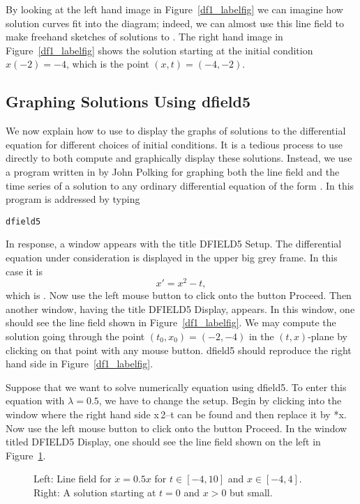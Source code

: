 By looking at the left hand image in Figure~\ref{df1_labelfig}
we can imagine how solution curves fit into the diagram; indeed,
we can almost use this line field to make freehand sketches
of solutions to .  The right hand image in
Figure~\ref{df1_labelfig} shows the solution starting at the
initial condition $x(-2) = -4$, which is the point $(x,t)=(-4,-2)$.


\subsection*{Graphing Solutions Using {\sf dfield5}}

We now explain how to use \Matlab to display the graphs of
solutions to the differential equation  for different
choices of initial conditions.  It is a tedious process to use
\Matlab directly to both compute and graphically display these
solutions.  Instead, we use a program written in \Matlab by John
Polking for graphing both the line field and the time 
series of a solution to any ordinary differential equation of the form
.  In \Matlab this program is addressed by typing
\begin{verbatim}
dfield5
\end{verbatim}
In response, a window appears with the title {\sf
DFIELD5 Setup.}  The differential equation under consideration is 
displayed in the upper big grey frame.  In this case it is
\[
	x' = x^2 - t,
\]
which is .  Now use the left 
mouse button to click onto the button {\sf Proceed}.  
Then another window, having the title {\sf DFIELD5 Display},
appears.  In this window, one should see the line
field shown in Figure~\ref{df1_labelfig}.  We may compute the
solution going through the point $(t_0,x_0)=(-2,-4)$ in the
$(t,x)$-plane by clicking on that point with any mouse button.
{\sf dfield5} should reproduce the right hand side in
Figure~\ref{df1_labelfig}.

Suppose that we want to solve numerically equation 
using {\sf dfield5}. To enter this equation with $\lambda = 0.5$,
we have to change the setup.  Begin by clicking into the window
where the right hand side {\sf x\^{$\,\!$}2--t} can be found and
then replace it by {*x}.  Now use the left mouse button
to click onto the button {\sf Proceed}.  In the window titled
{\sf DFIELD5 Display}, one should see the line field
 shown on
the left in Figure~\ref{df_dsp1}.
\begin{figure}[htb]
    \centerline{%
    }
    \caption{Left: Line field for $\dot{x}=0.5x$ for $t\in [-4,10]$ and
		$x\in [-4,4]$.  Right: A solution starting at $t=0$ and
		$x>0$ but small.}
    \label{df_dsp1}
\end{figure}

